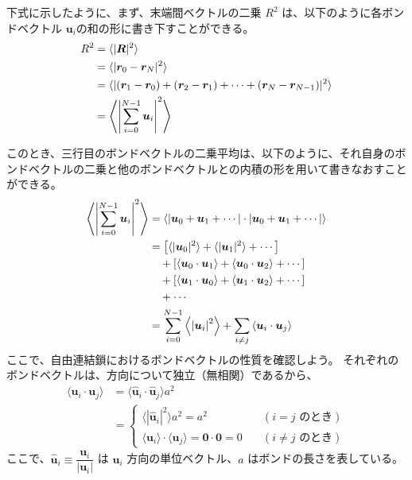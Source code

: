 \documentclass[11pt]{jsarticle}
\begin{document}
\begin{itemize}
\begin{enumerate}
	下式に示したように、まず、末端間ベクトルの二乗 $R^2$ は、以下のように各ボンドベクトル ${\bm u_i}$の和の形に書き下すことができる。
	\begin{align*}
	R^2
	&= \langle |\bm{R}|^2 \rangle \notag \\
	&=\langle |\bm{r}_0 - \bm{r}_N|^2 \rangle \notag \\
	&=\langle |(\bm{r}_1 - \bm{r}_0) + (\bm{r}_2 - \bm{r}_1) + \cdots + (\bm{r}_N - \bm{r}_{N-1})|^2 \rangle \notag \\
	&=\left\langle \left|\sum_{i=0}^{N-1}\bm{u}_i \right|^2 \right\rangle
	\end{align*}

	このとき、三行目のボンドベクトルの二乗平均は、以下のように、それ自身のボンドベクトルの二乗と他のボンドベクトルとの内積の形を用いて書きなおすことができる。
	\begin{align*}
	\left\langle \left|\sum_{i=0}^{N-1}\bm{u}_i \right|^2 \right\rangle
		&= \left\langle \left|\bm{u}_0 + \bm{u}_1 + \cdots \right| \cdot \left|\bm{u}_0 + \bm{u}_1 + \cdots \right| \right\rangle \notag \\
		&= \left[ \langle |\bm{u}_0|^2 \rangle + \langle|\bm{u}_1 |^2\rangle + \cdots \right] \notag \\
		&\quad +\left[ \langle \bm{u}_0 \cdot\bm{u}_1 \rangle + \langle \bm{u}_0 \cdot\bm{u}_2 \rangle + \cdots \right] \notag \\
		&\quad +\left[ \langle \bm{u}_1 \cdot\bm{u}_0 \rangle + \langle \bm{u}_1 \cdot\bm{u}_2 \rangle + \cdots \right] \notag \\
		&\quad + \cdots \notag \\
		&=\sum_{i=0}^{N-1} \left\langle \left|\bm{u}_i \right|^2 \right\rangle 
		+\sum_{i \neq j} \left\langle \bm{u}_i \cdot \bm{u}_j \right\rangle
	\end{align*}
	ここで、自由連結鎖におけるボンドベクトルの性質を確認しよう。
	それぞれのボンドベクトルは、方向について独立（無相関）であるから、
	\begin{align*}
	\langle \bm{u}_i \cdot \bm{u}_j \rangle 
	&= \langle \bm{\hat{u}}_i \cdot \bm{\hat{u}}_j \rangle a^2 \\
	&=
		\begin{cases}
		\langle |\bm{\hat{u}}_i |^2 \rangle a^2 = a^2	&\quad (\text{$i = j$ のとき}) \\
		\langle \bm{u}_i \rangle \cdot \langle \bm{u}_j \rangle = \bm{0}\cdot\bm{0} = 0	&\quad(\text{$i \neq j$ のとき})
		\end{cases}
	\end{align*}
	ここで、$\bm{\hat{u}}_i \equiv \dfrac{\bm{u}_i}{|\bm{u}_i|}$ は $\bm{u}_i$ 方向の単位ベクトル、$a$ はボンドの長さを表している。


\end{enumerate}
\end{itemize}
\end{document}
